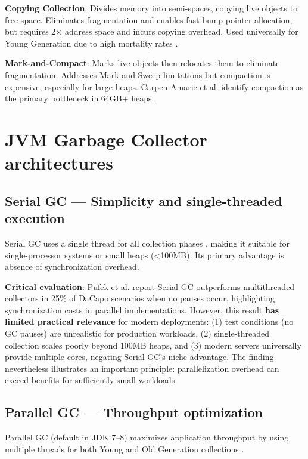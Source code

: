 \textbf{Copying Collection}: Divides memory into semi-spaces, copying live objects to free space. Eliminates fragmentation and enables fast bump-pointer allocation, but requires 2× address space and incurs copying overhead. Used universally for Young Generation due to high mortality rates \cite{carpen2015performance, oracle2023gc}.

\textbf{Mark-and-Compact}: Marks live objects then relocates them to eliminate fragmentation. Addresses Mark-and-Sweep limitations but compaction is expensive, especially for large heaps. Carpen-Amarie et al. \cite{carpen2015performance} identify compaction as the primary bottleneck in 64GB+ heaps.

\section{JVM Garbage Collector architectures}
\label{sec:gc-architectures}

\subsection{Serial GC --- Simplicity and single-threaded execution}
\label{subsec:serial-gc}

Serial GC uses a single thread for all collection phases \cite{oracle2023gc}, making it suitable for single-processor systems or small heaps (<100MB). Its primary advantage is absence of synchronization overhead.

\textbf{Critical evaluation}: Pufek et al. \cite{pufek2019analysis} report Serial GC outperforms multithreaded collectors in 25\% of DaCapo scenarios when no pauses occur, highlighting synchronization costs in parallel implementations. However, this result \textbf{has limited practical relevance} for modern deployments: (1) test conditions (no GC pauses) are unrealistic for production workloads, (2) single-threaded collection scales poorly beyond 100MB heaps, and (3) modern servers universally provide multiple cores, negating Serial GC's niche advantage. The finding nevertheless illustrates an important principle: parallelization overhead can exceed benefits for sufficiently small workloads.

\subsection{Parallel GC --- Throughput optimization}
\label{subsec:parallel-gc}

Parallel GC (default in JDK 7--8) maximizes application throughput by using multiple threads for both Young and Old Generation collections \cite{carpen2015performance, oracle2023gc}.


